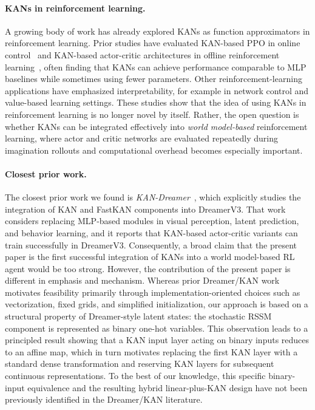 \documentclass[11pt, a4paper]{article}
\begin{document}
\paragraph{KANs in reinforcement learning.}
A growing body of work has already explored KANs as function approximators in
reinforcement learning. Prior studies have evaluated KAN-based PPO in online
control~\cite{kanppo2024} and KAN-based actor-critic architectures in offline reinforcement
learning~\cite{kanoffline2024}, often finding that KANs can achieve performance comparable to MLP
baselines while sometimes using fewer parameters. Other reinforcement-learning
applications have emphasized interpretability, for example in network control
and value-based learning settings. These studies show that the idea of using
KANs in reinforcement learning is no longer novel by itself. Rather, the open
question is whether KANs can be integrated effectively into
\emph{world model-based} reinforcement learning, where actor and critic
networks are evaluated repeatedly during imagination rollouts and computational
overhead becomes especially important. 

\paragraph{Closest prior work.}
The closest prior work we found is \emph{KAN-Dreamer}~\cite{kandreamer2025}, which explicitly studies
the integration of KAN and FastKAN components into DreamerV3. That work
considers replacing MLP-based modules in visual perception, latent prediction,
and behavior learning, and it reports that KAN-based actor-critic variants can
train successfully in DreamerV3. Consequently, a broad claim that the present
paper is the first successful integration of KANs into a world model-based RL
agent would be too strong. However, the contribution of the present paper is
different in emphasis and mechanism. Whereas prior Dreamer/KAN work motivates
feasibility primarily through implementation-oriented choices such as
vectorization, fixed grids, and simplified initialization, our approach is
based on a structural property of Dreamer-style latent states: the stochastic
RSSM component is represented as binary one-hot variables. This observation
leads to a principled result showing that a KAN input layer acting on binary
inputs reduces to an affine map, which in turn motivates replacing the first
KAN layer with a standard dense transformation and reserving KAN layers for
subsequent continuous representations. To the best of our knowledge, this
specific binary-input equivalence and the resulting hybrid linear-plus-KAN
design have not been previously identified in the Dreamer/KAN literature. 
\end{document}
